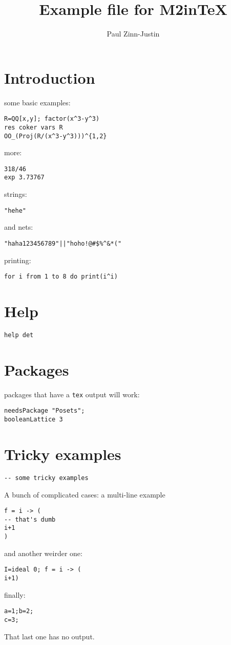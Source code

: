 \documentclass[12pt,a4paper]{amsart}
\title{Example file for M2inTeX}
\author{Paul Zinn-Justin}
\begin{document}
\maketitle

\section{Introduction}
some basic examples:
\begin{lstlisting}[language=Macaulay2]
R=QQ[x,y]; factor(x^3-y^3)
res coker vars R
OO_(Proj(R/(x^3-y^3)))^{1,2}
\end{lstlisting}
more:
\begin{lstlisting}[language=Macaulay2]
318/46
exp 3.73767
\end{lstlisting}
strings:
\begin{lstlisting}[language=Macaulay2]
"hehe"
\end{lstlisting}
and nets:
\begin{lstlisting}[language=Macaulay2]
"haha123456789"||"hoho!@#$%^&*("
\end{lstlisting}
printing:
\begin{lstlisting}[language=Macaulay2]
for i from 1 to 8 do print(i^i)
\end{lstlisting}

\section{Help}
\begin{lstlisting}[language=Macaulay2]
help det
\end{lstlisting}

\section{Packages}
packages that have a {\tt tex} output will work:
\begin{lstlisting}[language=Macaulay2]
needsPackage "Posets";
booleanLattice 3
\end{lstlisting}

\section{Tricky examples}
\begin{lstlisting}[language=Macaulay2]
-- some tricky examples
\end{lstlisting}
A bunch of complicated cases: a multi-line example
\begin{lstlisting}[language=Macaulay2]
f = i -> (
-- that's dumb
i+1
)
\end{lstlisting}
and another weirder one:
\begin{lstlisting}[language=Macaulay2]
I=ideal 0; f = i -> (
i+1)
\end{lstlisting}
finally:
\begin{lstlisting}[language=Macaulay2]
a=1;b=2;
c=3;
\end{lstlisting}
That last one has no output.
\end{document}
